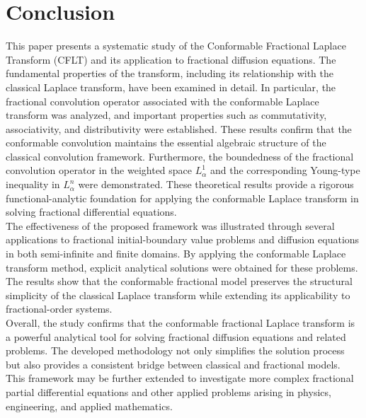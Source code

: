 \documentclass[two side,reqno,12pt]{amsart}
\numberwithin{equation}{section}
\theoremstyle{definition}
\begin{document}
\section{Conclusion}
This paper presents a systematic study of the Conformable Fractional Laplace Transform (CFLT) and its application to fractional diffusion equations. The fundamental properties of the transform, including its relationship with the classical Laplace transform, have been examined in detail. In particular, the fractional convolution operator associated with the conformable Laplace transform was analyzed, and important properties such as commutativity, associativity, and distributivity were established. These results confirm that the conformable convolution maintains the essential algebraic structure of the classical convolution framework.
Furthermore, the boundedness of the fractional convolution operator in the weighted space $L_{\alpha}^{1}$ and the corresponding Young-type inequality in $L_{\alpha}^{n}$ were demonstrated. These theoretical results provide a rigorous functional-analytic foundation for applying the conformable Laplace transform in solving fractional differential equations.\\
The effectiveness of the proposed framework was illustrated through several applications to fractional initial-boundary value problems and diffusion equations in both semi-infinite and finite domains. By applying the conformable Laplace transform method, explicit analytical solutions were obtained for these problems. The results show that the conformable fractional model preserves the structural simplicity of the classical Laplace transform while extending its applicability to fractional-order systems.\\
Overall, the study confirms that the conformable fractional Laplace transform is a powerful analytical tool for solving fractional diffusion equations and related problems. The developed methodology not only simplifies the solution process but also provides a consistent bridge between classical and fractional models. This framework may be further extended to investigate more complex fractional partial differential equations and other applied problems arising in physics, engineering, and applied mathematics.

\end{document}
